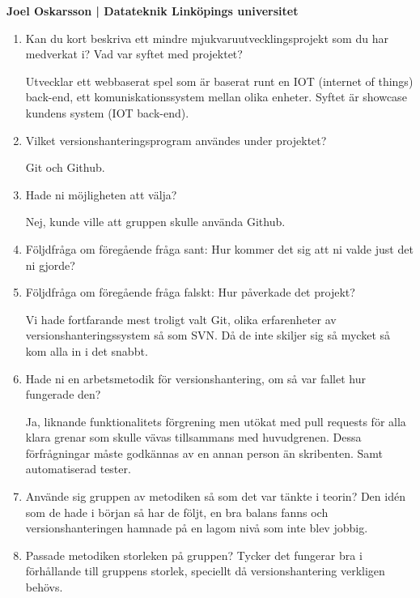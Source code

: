\clearpage
\begin{center}
    \textbf{Joel Oskarsson | Datateknik Linköpings universitet}
\end{center}
\begin{enumerate}

  \item Kan du kort beskriva ett mindre mjukvaruutvecklingsprojekt som du har medverkat i? Vad var syftet med projektet?

  Utvecklar ett webbaserat spel som är baserat runt en IOT (internet of things) back-end, ett komuniskationssystem mellan olika enheter. Syftet är showcase kundens system (IOT back-end).

  \item Vilket versionshanteringsprogram användes under projektet?

  Git och Github.

  \item Hade ni möjligheten att välja?

  Nej, kunde ville att gruppen skulle använda Github.

  \item Följdfråga om föregående fråga sant: Hur kommer det sig att ni valde just det ni gjorde?
  \item Följdfråga om föregående fråga falskt: Hur påverkade det projekt?

  Vi hade fortfarande mest troligt valt Git, olika erfarenheter av versionshanteringssystem så som SVN. Då de inte skiljer sig så mycket så kom alla in i det snabbt.

  \item Hade ni en arbetsmetodik för versionshantering, om så var fallet hur fungerade den?

  Ja, liknande funktionalitets förgrening men utökat med pull requests för alla klara grenar som skulle vävas tillsammans med huvudgrenen. Dessa förfrågningar måste godkännas av en annan person än skribenten. Samt automatiserad tester.

  \item Använde sig gruppen av metodiken så som det var tänkte i teorin?
  Den idén som de hade i början så har de följt, en bra balans fanns och versionshanteringen hamnade på en lagom nivå som inte blev jobbig.

  \item Passade metodiken storleken på gruppen?
  Tycker det fungerar bra  i förhållande till gruppens storlek, speciellt då versionshantering verkligen behövs.


\end{enumerate}
